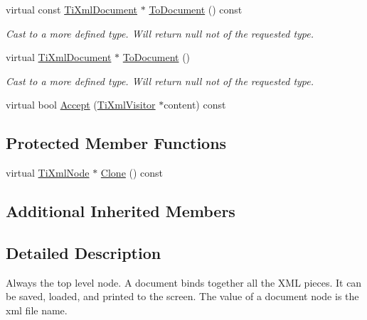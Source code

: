 \begin{DoxyCompactItemize}
\item 
virtual const \hyperlink{classTiXmlDocument}{Ti\+Xml\+Document} $\ast$ \hyperlink{classTiXmlDocument_a1dc977bde3e4fe85a8eb9d88a35ef5a4}{To\+Document} () const \hypertarget{classTiXmlDocument_a1dc977bde3e4fe85a8eb9d88a35ef5a4}{}\label{classTiXmlDocument_a1dc977bde3e4fe85a8eb9d88a35ef5a4}

\begin{DoxyCompactList}\small\item\em Cast to a more defined type. Will return null not of the requested type. \end{DoxyCompactList}\item 
virtual \hyperlink{classTiXmlDocument}{Ti\+Xml\+Document} $\ast$ \hyperlink{classTiXmlDocument_a1025d942a1f328fd742d545e37efdd42}{To\+Document} ()\hypertarget{classTiXmlDocument_a1025d942a1f328fd742d545e37efdd42}{}\label{classTiXmlDocument_a1025d942a1f328fd742d545e37efdd42}

\begin{DoxyCompactList}\small\item\em Cast to a more defined type. Will return null not of the requested type. \end{DoxyCompactList}\item 
virtual bool \hyperlink{classTiXmlDocument_a3daab2f472418ef66315750202f762ae}{Accept} (\hyperlink{classTiXmlVisitor}{Ti\+Xml\+Visitor} $\ast$content) const 
\end{DoxyCompactItemize}
\subsection*{Protected Member Functions}
\begin{DoxyCompactItemize}
\item 
virtual \hyperlink{classTiXmlNode}{Ti\+Xml\+Node} $\ast$ \hyperlink{classTiXmlDocument_ac9e8f09b23454d953b32d1b65cd1409e}{Clone} () const 
\end{DoxyCompactItemize}
\subsection*{Additional Inherited Members}


\subsection{Detailed Description}
Always the top level node. A document binds together all the X\+ML pieces. It can be saved, loaded, and printed to the screen. The \textquotesingle{}value\textquotesingle{} of a document node is the xml file name. 

